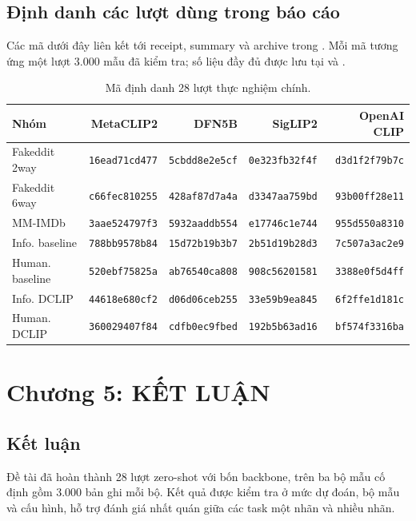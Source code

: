 \documentclass[12pt,a4paper]{article}
\begin{document}
\subsection{Định danh các lượt dùng trong báo cáo}
Các mã dưới đây liên kết tới receipt, summary và archive trong . Mỗi mã tương ứng một lượt 3.000 mẫu đã kiểm tra; số liệu đầy đủ được lưu tại  và  \cite{resultaudit}.
\begin{table}[H]\centering\small
\caption{Mã định danh 28 lượt thực nghiệm chính.}\label{tab:runids}
\begin{tabular}{lrrrr}\toprule
\textbf{Nhóm}&\textbf{MetaCLIP2}&\textbf{DFN5B}&\textbf{SigLIP2}&\textbf{OpenAI CLIP}\\\midrule
Fakeddit 2way&\texttt{16ead71cd477}&\texttt{5cbdd8e2e5cf}&\texttt{0e323fb32f4f}&\texttt{d3d1f2f79b7c}\\
Fakeddit 6way&\texttt{c66fec810255}&\texttt{428af87d7a4a}&\texttt{d3347aa759bd}&\texttt{93b00ff28e11}\\
MM-IMDb&\texttt{3aae524797f3}&\texttt{5932aaddb554}&\texttt{e17746c1e744}&\texttt{955d550a8310}\\
Info. baseline&\texttt{788bb9578b84}&\texttt{15d72b19b3b7}&\texttt{2b51d19b28d3}&\texttt{7c507a3ac2e9}\\
Human. baseline&\texttt{520ebf75825a}&\texttt{ab76540ca808}&\texttt{908c56201581}&\texttt{3388e0f5d4ff}\\
Info. DCLIP&\texttt{44618e680cf2}&\texttt{d06d06ceb255}&\texttt{33e59b9ea845}&\texttt{6f2ffe1d181c}\\
Human. DCLIP&\texttt{360029407f84}&\texttt{cdfb0ec9fbed}&\texttt{192b5b63ad16}&\texttt{bf574f3316ba}\\
\bottomrule\end{tabular}\end{table}

\newpage
\section{Chương 5: KẾT LUẬN}
\subsection{Kết luận}
Đề tài đã hoàn thành 28 lượt zero-shot với bốn backbone, trên ba bộ mẫu cố định gồm 3.000 bản ghi mỗi bộ. Kết quả được kiểm tra ở mức dự đoán, bộ mẫu và cấu hình, hỗ trợ đánh giá nhất quán giữa các task một nhãn và nhiều nhãn.
\end{document}
